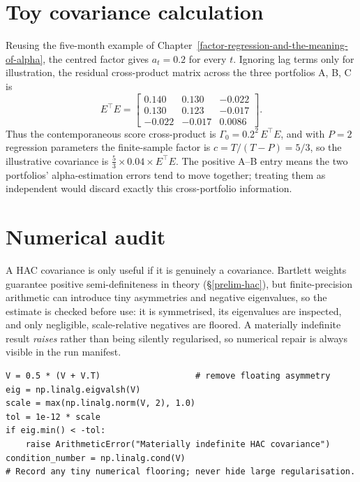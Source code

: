 \hypertarget{toy-covariance-calculation}{%
\section{Toy covariance calculation}\label{toy-covariance-calculation}}

Reusing the five-month example of Chapter~\ref{factor-regression-and-the-meaning-of-alpha},
the centred factor gives $a_t=0.2$ for every $t$. Ignoring lag terms only
for illustration, the residual cross-product matrix across the three
portfolios A, B, C is
\begin{equation}\label{eq:ch6-toy}
E^{\top}E = \begin{bmatrix}
 0.140 &  0.130 & -0.022\\
 0.130 &  0.123 & -0.017\\
-0.022 & -0.017 &  0.0086
\end{bmatrix}.
\end{equation}
Thus the contemporaneous score cross-product is $\Gamma_0 = 0.2^2\,E^{\top}E$,
and with $P=2$ regression parameters the finite-sample factor is
$c=T/(T-P)=5/3$, so the illustrative covariance is
$\tfrac53\times 0.04\times E^{\top}E$. The positive A--B entry means the two
portfolios' alpha-estimation errors tend to move together; treating them as
independent would discard exactly this cross-portfolio information.

\hypertarget{numerical-audit}{%
\section{Numerical audit}\label{numerical-audit}}

A HAC covariance is only useful if it is genuinely a covariance. Bartlett
weights guarantee positive semi-definiteness in theory
(\S\ref{prelim-hac}), but finite-precision arithmetic can introduce tiny
asymmetries and negative eigenvalues, so the estimate is checked before
use: it is symmetrised, its eigenvalues are inspected, and only negligible,
scale-relative negatives are floored. A materially indefinite result
\emph{raises} rather than being silently regularised, so numerical repair
is always visible in the run manifest.

\begin{verbatim}
V = 0.5 * (V + V.T)                   # remove floating asymmetry
eig = np.linalg.eigvalsh(V)
scale = max(np.linalg.norm(V, 2), 1.0)
tol = 1e-12 * scale
if eig.min() < -tol:
    raise ArithmeticError("Materially indefinite HAC covariance")
condition_number = np.linalg.cond(V)
# Record any tiny numerical flooring; never hide large regularisation.
\end{verbatim}

